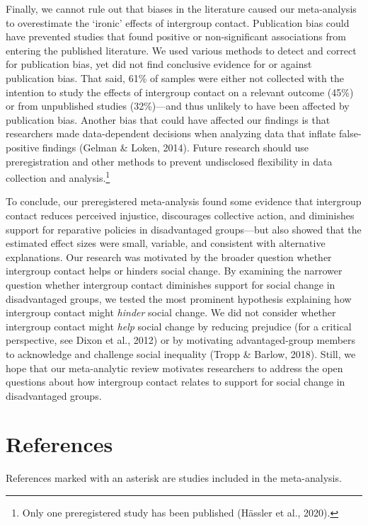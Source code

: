 \documentclass[12pt, letterpaper]{article}
\begin{document}
Finally, we cannot rule out that biases in the literature caused our
meta-analysis to overestimate the `ironic' effects of intergroup
contact. Publication bias could have prevented studies that found
positive or non-significant associations from entering the published
literature. We used various methods to detect and correct for
publication bias, yet did not find conclusive evidence for or against
publication bias. That said, 61\% of samples were either not collected
with the intention to study the effects of intergroup contact on a
relevant outcome (45\%) or from unpublished studies (32\%)---and thus
unlikely to have been affected by publication bias. Another bias that
could have affected our findings is that researchers made data-dependent
decisions when analyzing data that inflate false-positive findings
(Gelman \& Loken, 2014). Future research should use preregistration and
other methods to prevent undisclosed flexibility in data collection and
analysis.\footnote{Only one preregistered study has been published
  (Hässler et al., 2020).}

To conclude, our preregistered meta-analysis found some evidence that
intergroup contact reduces perceived injustice, discourages collective
action, and diminishes support for reparative policies in disadvantaged
groups---but also showed that the estimated effect sizes were small,
variable, and consistent with alternative explanations. Our research was
motivated by the broader question whether intergroup contact helps or
hinders social change. By examining the narrower question whether
intergroup contact diminishes support for social change in disadvantaged
groups, we tested the most prominent hypothesis explaining how
intergroup contact might \emph{hinder} social change. We did not
consider whether intergroup contact might \emph{help} social change by
reducing prejudice (for a critical perspective, see Dixon et al., 2012)
or by motivating advantaged-group members to acknowledge and challenge
social inequality (Tropp \& Barlow, 2018). Still, we hope that our
meta-analytic review motivates researchers to address the open questions
about how intergroup contact relates to support for social change in
disadvantaged groups.

\hypertarget{references}{%
\section{References}\label{references}}

\noindent References marked with an asterisk are studies included in the
meta-analysis.
\end{document}
